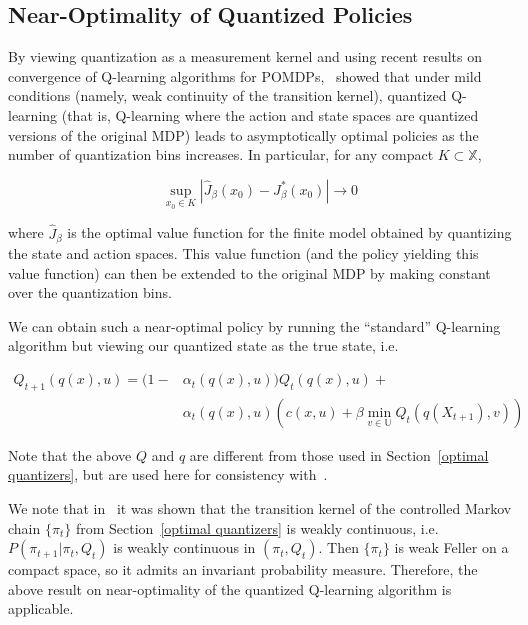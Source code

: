 \documentclass{article}
\begin{document}
\subsection{Near-Optimality of Quantized Policies}
By viewing quantization as a measurement kernel and using recent results on convergence of Q-learning algorithms for POMDPs,~\cite{Kara} showed that under mild conditions (namely, weak continuity of the transition kernel), quantized Q-learning (that is, Q-learning where the action and state spaces are quantized versions of the original MDP) leads to asymptotically optimal policies as the number of quantization bins increases. In particular, for any compact \( K \subset \mathbb{X} \),

\[ \sup_{x_0 \in K}|\hat{J}_{\beta}(x_0) - J_{\beta}^*(x_0)| \to 0 \]

where \( \hat{J}_{\beta} \) is the optimal value function for the finite model obtained by quantizing the state and action spaces. This value function (and the policy yielding this value function) can then be extended to the original MDP by making constant over the quantization bins.

We can obtain such a near-optimal policy by running the ``standard'' Q-learning algorithm but viewing our quantized state as the true state, i.e.

\begin{equation}
    \begin{split}
        Q_{t+1}(q(x),u) = (1- & \alpha_t(q(x),u))Q_t(q(x),u) + \\
        & \alpha_t(q(x),u)(c(x,u)+\beta \; \underset{v\in\mathbb{U}}{\text{min}} \; Q_t(q(X_{t+1}),v))\label{eq:2}
    \end{split}
\end{equation}

Note that the above \( Q \) and \( q \) are different from those used in Section~\ref{optimal quantizers}, but are used here for consistency with~\cite{Kara}.

We note that in~\cite{Linder} it was shown that the transition kernel of the controlled Markov chain \( \{\pi_t\} \) from Section~\ref{optimal quantizers} is weakly continuous, i.e. \\ \( P(\pi_{t+1} | \pi_t, Q_t) \) is weakly continuous in \( (\pi_t, Q_t) \). Then \( \{ \pi_t \} \) is weak Feller on a compact space, so it admits an invariant probability measure. Therefore, the above result on near-optimality of the quantized Q-learning algorithm is applicable.
\end{document}
